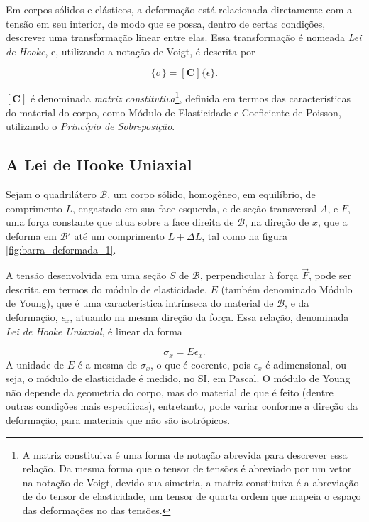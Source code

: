 Em corpos sólidos e elásticos, a deformação está relacionada diretamente com a tensão em seu interior, de modo que se possa, dentro de certas condições, descrever uma transformação linear entre elas. Essa transformação é nomeada \emph{Lei de Hooke}, e, utilizando a notação de Voigt, é descrita por

\begin{equation}
    \{\sigma\} = [\bm{C}] \{\epsilon\}.
    \label{eq:lei_de_hooke}
\end{equation}

$[\bm{C}]$ é denominada \emph{matriz constitutiva}\footnote{A matriz constituiva é uma forma de notação abrevida para descrever essa relação. Da mesma forma que o tensor de tensões é abreviado por um vetor na notação de Voigt, devido sua simetria, a matriz constituiva é a abreviação de do tensor de elasticidade, um tensor de quarta ordem que mapeia o espaço das deformações no das tensões.}, definida em termos das características do material do corpo, como Módulo de Elasticidade e Coeficiente de Poisson, utilizando o \emph{Princípio de Sobreposição}.

\subsection{A Lei de Hooke Uniaxial}

Sejam o quadrilátero $\mathcal{B}$, um corpo sólido, homogêneo, em equilíbrio, de comprimento $L$, engastado em sua face esquerda, e de seção transversal $A$, e $F$, uma força constante que atua sobre a face direita de $\mathcal{B}$, na direção de $x$, que a deforma em $\mathcal{B}'$ até um comprimento $L+\Delta L$, tal como na figura \ref{fig:barra_deformada_1}. 



A tensão desenvolvida em uma seção $S$ de $\mathcal{B}$, perpendicular à força $\vec{F}$, pode ser descrita em termos do módulo de elasticidade, $E$ (também denominado Módulo de Young), que é uma característica intrínseca do material de $\mathcal{B}$, e da deformação, $\epsilon_x$, atuando na mesma direção da força. Essa relação, denominada \emph{Lei de Hooke Uniaxial}, é linear da forma

\begin{equation}
    \sigma_x = E \epsilon_x.
    \label{eq:lei_de_hooke_uniaxial}
\end{equation} 
A unidade de $E$ é a mesma de $\sigma_x$, o que é coerente, pois $\epsilon_x$ é adimensional, ou seja, o módulo de elasticidade é medido, no SI, em Pascal. O módulo de Young não depende da geometria do corpo, mas do material de que é feito (dentre outras condições mais específicas), entretanto, pode variar conforme a direção da deformação, para materiais que não são isotrópicos.

